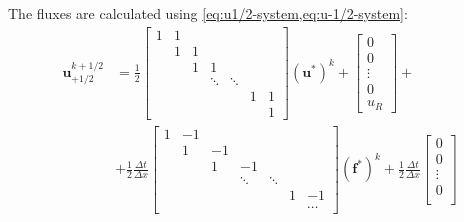 The fluxes are calculated using \cref{eq:u1/2-system,eq:u-1/2-system}:
\begin{subequations}
    \begin{equation}
        \label{eq:dirichlet_plus_flux}
        \begin{split}
            \mathbf{{u}}_{+1/2}^{k+1/2}&=\frac{1}{2}
            \begin{bmatrix}
                1 & 1 &   &        &        &   &   \\
                & 1 & 1 &        &        &   &   \\
                &   & 1 & 1      &        &   &   \\
                &   &   & \ddots & \ddots &   &   \\
                &   &   &        &        & 1 & 1 \\
                &   &   &        &        &   & 1
            \end{bmatrix}\left( \mathbf{u}^* \right)^k+
            \begin{bmatrix}
                0      \\
                0      \\
                \vdots \\
                0      \\
                u_R
            \end{bmatrix}+\\
            &+\frac{1}{2}\frac{\Delta t}{\Delta x}
            \begin{bmatrix}
                1 & -1 &    &        &        &   &        \\
                & 1  & -1 &        &        &   &        \\
                &    & 1  & -1     &        &   &        \\
                &    &    & \ddots & \ddots &   &        \\
                &    &    &        &        & 1 & -1     \\
                &    &    &        &        &   & \cdots
            \end{bmatrix}\left( \mathbf{f}^* \right)^k+
            \frac{1}{2}\frac{\Delta t}{\Delta x}
            \begin{bmatrix}
                0      \\
                0      \\
                \vdots \\
                0      \\

\end{bmatrix}
\end{split}
\end{equation}
\end{subequations}
